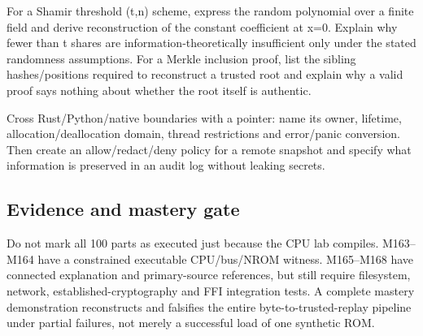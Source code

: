 For a Shamir threshold (t,n) scheme, express the random polynomial over a finite field and derive reconstruction of the constant coefficient at x=0. Explain why fewer than t shares are information-theoretically insufficient only under the stated randomness assumptions. For a Merkle inclusion proof, list the sibling hashes/positions required to reconstruct a trusted root and explain why a valid proof says nothing about whether the root itself is authentic.

Cross Rust/Python/native boundaries with a pointer: name its owner, lifetime, allocation/deallocation domain, thread restrictions and error/panic conversion. Then create an allow/redact/deny policy for a remote snapshot and specify what information is preserved in an audit log without leaking secrets.

\subsection{Evidence and mastery gate}\label{appendix-11f73b337e37-evidence-and-mastery-gate}

Do not mark all 100 parts as executed just because the CPU lab compiles. M163--M164 have a constrained executable CPU/bus/NROM witness. M165--M168 have connected explanation and primary-source references, but still require filesystem, network, established-cryptography and FFI integration tests. A complete mastery demonstration reconstructs and falsifies the entire byte-to-trusted-replay pipeline under partial failures, not merely a successful load of one synthetic ROM.
